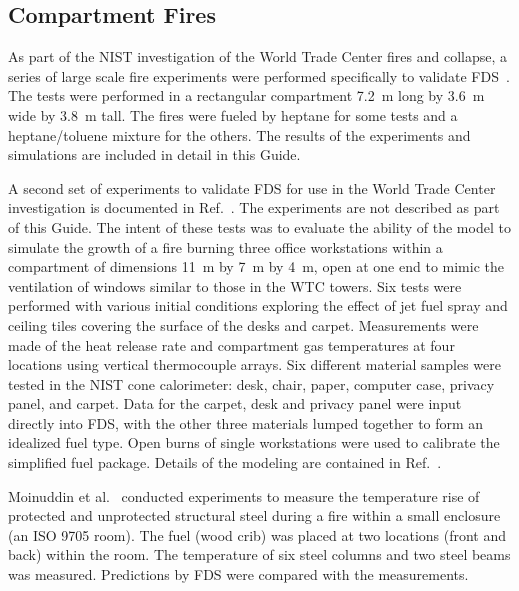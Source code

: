 \subsection{Compartment Fires}

As part of the NIST investigation of the World Trade Center fires and collapse, a series of large scale fire experiments were performed
specifically to validate FDS~\cite{NIST_NCSTAR_1-5B}.  The tests were performed in a rectangular compartment 7.2~m long by 3.6~m wide by 3.8~m
tall.  The fires were fueled by heptane for some tests and a heptane/toluene mixture for the others. The results of the experiments and simulations
are included in detail in this Guide.

A second set of experiments to validate FDS for use in the World Trade Center investigation is documented in Ref.~\cite{NIST_NCSTAR_1-5E}. The experiments are not described as part of this Guide. The intent of these tests was to evaluate the ability of the model to simulate the growth of a fire burning three office workstations within a compartment of dimensions 11~m by 7~m by 4~m, open at one end to mimic the ventilation of windows similar to those in the WTC towers. Six tests were performed with various initial conditions exploring the effect of jet fuel spray and ceiling tiles covering the surface of the desks and carpet. Measurements were made of the heat release rate and compartment gas  temperatures at four  locations using vertical thermocouple arrays. Six different material samples were tested in the NIST cone calorimeter: desk, chair, paper, computer case, privacy panel, and carpet. Data for the carpet, desk and privacy panel were input directly into FDS, with the other three materials lumped together to form an idealized fuel type. Open burns of single workstations were used to calibrate the simplified fuel package. Details of the modeling are contained in Ref.~\cite{NIST_NCSTAR_1-5F}.

Moinuddin et al.~\cite{Moinuddin:FSJ2011} conducted experiments to measure the temperature rise of protected and unprotected structural steel during a fire within a small enclosure (an ISO 9705 room). The fuel (wood crib) was placed at two locations (front and back) within the room. The temperature of six steel columns and two steel beams was measured. Predictions by FDS were compared with the measurements.

